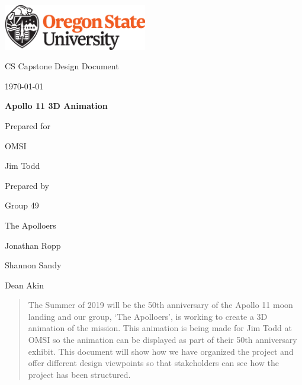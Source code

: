 \documentclass[onecolumn, draftclsnofoot,10pt, compsoc]{IEEEtran}
\def \CapstoneTeamName{		    The Apolloers}
\def \CapstoneTeamNumber{		49}
\def \GroupMemberOne{			Jonathan Ropp}
\def \GroupMemberTwo{			Shannon Sandy}
\def \GroupMemberThree{			Dean Akin}
\def \CapstoneProjectName{		Apollo 11 3D Animation}
\def \CapstoneSponsorCompany{	OMSI}
\def \CapstoneSponsorPersona{	Jim Todd}
\newcommand{\NameSigPair}[1]{\par
\makebox[2.75in][r]{#1} \hfil 	\makebox[3.25in]{\makebox[2.25in]{\hrulefill} \hfill		\makebox[.75in]{\hrulefill}}
\par\vspace{-12pt} \textit{\tiny\noindent
\makebox[2.75in]{} \hfil		\makebox[3.25in]{\makebox[2.25in][r]{Signature} \hfill	\makebox[.75in][r]{Date}}}}
\renewcommand{\NameSigPair}[1]{#1}
\begin{document}
\begin{titlepage}
    \begin{singlespace}

\includegraphics[height=2cm]{OSU_horizontal_2C_O_over_B.eps}   
        \par\vspace{.2in}
        \centering
        \scshape{
            \huge CS Capstone Design Document \par
            {\large\today}\par
            \vspace{.5in}
            \textbf{\Huge\CapstoneProjectName}\par
            \vfill
            {\large Prepared for}\par
            \Huge \CapstoneSponsorCompany\par
            \vspace{5pt}
            {\Large\NameSigPair{\CapstoneSponsorPersona}\par}
            {\large Prepared by }\par
            Group\CapstoneTeamNumber\par
            \CapstoneTeamName\par 
            \vspace{5pt}
            {\Large
                \NameSigPair{\GroupMemberOne}\par
                \NameSigPair{\GroupMemberTwo}\par
                \NameSigPair{\GroupMemberThree}\par
            }
            \vspace{20pt}
        }
        \begin{abstract}

    
The Summer of 2019 will be the 50th anniversary of the Apollo 11 moon landing and our group, `The Apolloers', is working to create a 3D animation of the mission. This animation is being made for Jim Todd at OMSI so the animation can be displayed as part of their 50th anniversary exhibit. This document will show how we have organized the project and offer different design viewpoints so that stakeholders can see how the project has been structured. 

        \end{abstract}    
    \end{singlespace}
\end{titlepage}
\end{document}
